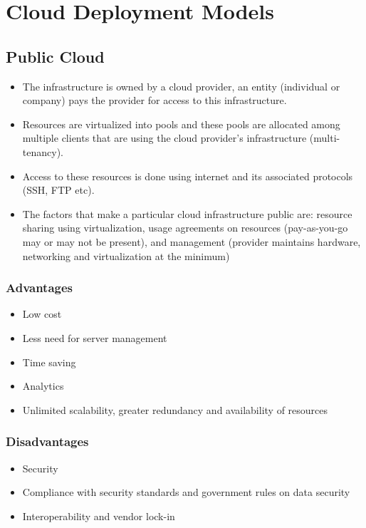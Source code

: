 \documentclass{article}
\begin{document}
\section{Cloud Deployment Models}
\subsection{Public Cloud}
\begin{itemize}
    \item The infrastructure is owned by a cloud provider, an entity (individual or company) pays the provider for access to this infrastructure. 
    
    \item Resources are virtualized into pools and these pools are allocated among multiple clients that are using the cloud provider's infrastructure (multi-tenancy). 
    
    \item Access to these resources is done using internet and its associated protocols (SSH, FTP etc).
    
    \item The factors that make a particular cloud infrastructure public are: resource sharing using virtualization, usage agreements on resources (pay-as-you-go may or may not be present), and management (provider maintains hardware, networking and virtualization at the minimum)
\end{itemize}

\subsubsection{Advantages}
\begin{itemize}
    \item Low cost
    
    \item Less need for server management
    
    \item Time saving
    
    \item Analytics
    
    \item Unlimited scalability, greater redundancy and availability of resources
\end{itemize}

\subsubsection{Disadvantages}
\begin{itemize}
    \item Security
    
    \item Compliance with security standards and government rules on data security
    
    \item Interoperability and vendor lock-in
\end{itemize}
\end{document}
